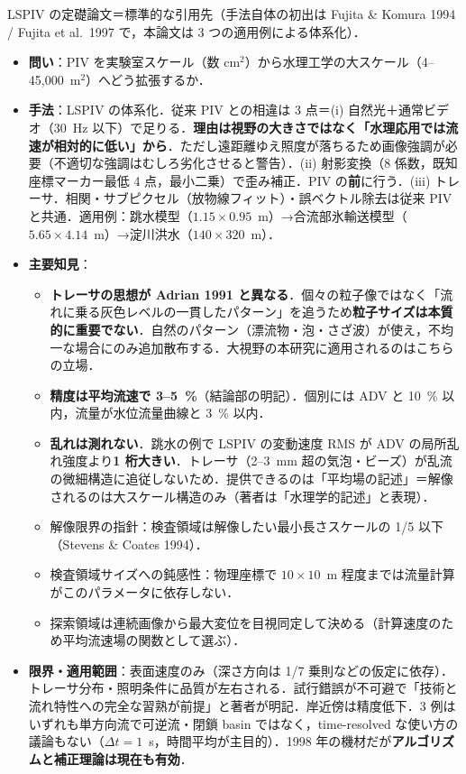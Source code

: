 \documentclass[11pt]{jsarticle}
\newcommand{\litref}[1]{{\large\bfseries\color{citecolor}#1}}
\begin{document}
\noindent\litref{Fujita et al. (1998)}\quad LSPIV の定礎論文＝標準的な引用先（手法自体の初出は Fujita \& Komura 1994 / Fujita et al.\ 1997 で，本論文は 3 つの適用例による体系化）．
\begin{itemize}
  \item \textbf{問い}：PIV を実験室スケール（数 cm$^2$）から水理工学の大スケール（4--45{,}000~m$^2$）へどう拡張するか．
  \item \textbf{手法}：LSPIV の体系化．従来 PIV との相違は 3 点＝(i) 自然光＋通常ビデオ（30~Hz 以下）で足りる．\textbf{理由は視野の大きさではなく「水理応用では流速が相対的に低い」から}．ただし遠距離ゆえ照度が落ちるため画像強調が必要（不適切な強調はむしろ劣化させると警告）．(ii) 射影変換（8 係数，既知座標マーカー最低 4 点，最小二乗）で歪み補正．PIV の\textbf{前}に行う．(iii) トレーサ．相関・サブピクセル（放物線フィット）・誤ベクトル除去は従来 PIV と共通．適用例：跳水模型（$1.15 \times 0.95$~m）→合流部氷輸送模型（$5.65 \times 4.14$~m）→淀川洪水（$140 \times 320$~m）．
  \item \textbf{主要知見}：
  \begin{itemize}
    \item \textbf{トレーサの思想が Adrian 1991 と異なる}．個々の粒子像ではなく「流れに乗る灰色レベルの一貫したパターン」を追うため\textbf{粒子サイズは本質的に重要でない}．自然のパターン（漂流物・泡・さざ波）が使え，不均一な場合にのみ追加散布する．大視野の本研究に適用されるのはこちらの立場．
    \item \textbf{精度は平均流速で 3--5~\%}（結論部の明記）．個別には ADV と 10~\% 以内，流量が水位流量曲線と 3~\% 以内．
    \item \textbf{乱れは測れない}．跳水の例で LSPIV の変動速度 RMS が ADV の局所乱れ強度より\textbf{1 桁大きい}．トレーサ（2--3~mm 超の気泡・ビーズ）が乱流の微細構造に追従しないため．提供できるのは「平均場の記述」＝解像されるのは大スケール構造のみ（著者は「水理学的記述」と表現）．
    \item 解像限界の指針：検査領域は解像したい最小長さスケールの 1/5 以下（Stevens \& Coates 1994）．
    \item 検査領域サイズへの鈍感性：物理座標で $10 \times 10$~m 程度までは流量計算がこのパラメータに依存しない．
    \item 探索領域は連続画像から最大変位を目視同定して決める（計算速度のため平均流速場の関数として選ぶ）．
  \end{itemize}
  \item \textbf{限界・適用範囲}：表面速度のみ（深さ方向は 1/7 乗則などの仮定に依存）．トレーサ分布・照明条件に品質が左右される．試行錯誤が不可避で「技術と流れ特性への完全な習熟が前提」と著者が明記．岸近傍は精度低下．3 例はいずれも単方向流で可逆流・閉鎖 basin ではなく，time-resolved な使い方の議論もない（$\Delta t = 1$~s，時間平均が主目的）．1998 年の機材だが\textbf{アルゴリズムと補正理論は現在も有効}．

\end{itemize}
\end{document}
